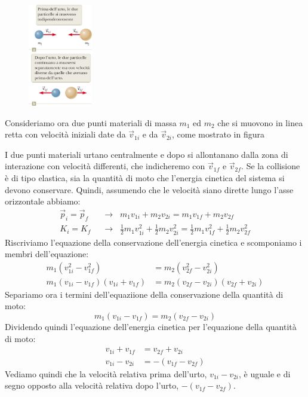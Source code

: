 \documentclass[a4paper,11pt,oneside]{book}
\begin{document}
\begin{figure}
    \centering
    \includegraphics[width=0.25\textwidth]{urto_elastico.png}
\end{figure}
Consideriamo ora due punti materiali di massa $m_1$ ed $m_2$ che si muovono in linea retta con velocità iniziali date da $\vec{v}_{1i}$ e da $\vec{v}_{2i}$, come mostrato in figura

I due punti materiali urtano centralmente e dopo si allontanano dalla zona di interazione con velocità differenti, che indicheremo con $\vec{v}_{1f}$ e $\vec{v}_{2f}$.
Se la collisione è di tipo elastica, sia la quantità di moto che l'energia cinetica del sistema si devono conservare.
Quindi, assumendo che le velocità siano dirette lungo l’asse orizzontale abbiamo:
\begin{align*}
    \vec{p}_i = \vec{p}_f \;\; &\rightarrow \;\; m_1v_{1i} +  m_2v_{2i} = m_1v_{1f} +  m_2v_{2f} \\
    K_i = K_f \;\; &\rightarrow \;\;\tfrac{1}{2} m_1v_{1i}^2 + \tfrac{1}{2} m_2v_{2i}^2 = \tfrac{1}{2} m_1v_{1f}^2 + \tfrac{1}{2} m_2v_{2f}^2
\end{align*}
Riscriviamo l'equazione della conservazione dell'energia cinetica e scomponiamo i membri dell'equazione:
\begin{align*}
    m_1(v_{1i}^2 - v_{1f}^2) &= m_2(v_{2f}^2 - v_{2i}^2) \\
    m_1(v_{1i} - v_{1f})(v_{1i} + v_{1f}) &= m_2(v_{2f} - v_{2i})(v_{2f} + v_{2i})
\end{align*}
Separiamo ora i termini dell'equaziione della conservazione della quantità di moto:
\begin{equation*}
    m_1(v_{1i} - v_{1f}) = m_2(v_{2f} - v_{2i})
\end{equation*}
Dividendo quindi l'equazione dell'energia cinetica per l'equazione della quantità di moto:
\begin{align*}
    v_{1i} + v_{1f} &= v_{2f} + v_{2i} \\ 
    v_{1i} - v_{2i} &= -(v_{1f} - v_{2f})
\end{align*}
Vediamo quindi che la velocità relativa prima dell'urto, $v_{1i} - v_{2i}$, è uguale e di segno opposto alla velocità relativa dopo l'urto, $-(v_{1f} - v_{2f})$.
\end{document}
